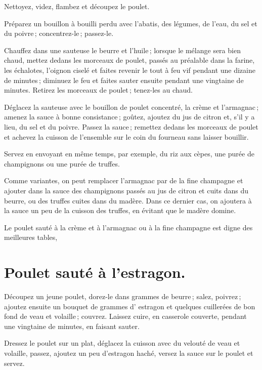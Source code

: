 Nettoyez, videz, flambez et découpez le poulet.

Préparez un bouillon à bouilli perdu avec l'abatis, des légumes, de l'eau, du sel
et du poivre ; concentrez-le ; passez-le.

Chauffez dans une sauteuse le beurre et l'huile ; lorsque le mélange sera bien
chaud, mettez dedans les morceaux de poulet, passés au préalable dans la
farine, les échalotes, l'oignon ciselé et faites revenir le tout à feu vif
pendant une dizaine de minutes ; diminuez le feu et faites sauter ensuite
pendant une vingtaine de minutes. Retirez les morceaux de poulet ; tenez-les au
chaud.

Déglacez la sauteuse avec le bouillon de poulet concentré, la crème et
l'armagnac ; amenez la sauce à bonne consistance ; goûtez, ajoutez du jus de
citron et, s'il y a lieu, du sel et du poivre. Passez la sauce ; remettez
dedans les morceaux de poulet et achevez la cuisson de l'ensemble sur le coin
du fourneau sans laisser bouillir.

Servez en envoyant en même temps, par exemple, du riz aux cèpes, une purée
de champignons ou une purée de truffes.

\sk

Comme variantes, on peut remplacer l'armagnac par de la fine champagne et
ajouter dans la sauce des champignons passés au jus de citron et cuits dans du
beurre, ou des truffes cuites dans du madère. Dans ce dernier cas, on ajoutera à
la sauce un peu de la cuisson des truffes, en évitant que le madère domine.

Le poulet sauté à la crème et à l'armagnac ou à la fine champagne est digne
des meilleures tables,

\section*{\centering Poulet sauté à l'estragon.}
{}

Découpez un jeune poulet, dorez-le dans {\mmm} grammes de beurre ; salez,
poivrez ; ajoutez ensuite un bouquet de {\mmm} grammes d' estragon et
quelques cuillerées de bon fond de veau et volaille ; couvrez. Laissez cuire,
en casserole couverte, pendant une vingtaine de minutes, en faisant sauter.

Dressez le poulet sur un plat, déglacez la cuisson avec du velouté de veau et
volaille, passez, ajoutez un peu d'estragon haché, versez la sauce sur le
poulet et servez.


